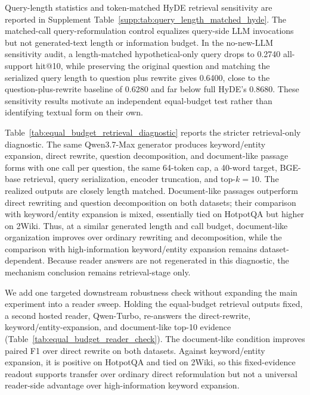 Query-length statistics and token-matched HyDE retrieval sensitivity are reported in Supplement Table~\ref{supp:tab:query_length_matched_hyde}. The matched-call query-reformulation control equalizes query-side LLM invocations but not generated-text length or information budget. In the no-new-LLM sensitivity audit, a length-matched hypothetical-only query drops to 0.2740 all-support hit@10, while preserving the original question and matching the serialized query length to question plus rewrite gives 0.6400, close to the question-plus-rewrite baseline of 0.6280 and far below full HyDE's 0.8680. These sensitivity results motivate an independent equal-budget test rather than identifying textual form on their own.

Table~\ref{tab:equal_budget_retrieval_diagnostic} reports the stricter retrieval-only diagnostic. The same Qwen3.7-Max generator produces keyword/entity expansion, direct rewrite, question decomposition, and document-like passage forms with one call per question, the same 64-token cap, a 40-word target, BGE-base retrieval, query serialization, encoder truncation, and top-$k=10$. The realized outputs are closely length matched. Document-like passages outperform direct rewriting and question decomposition on both datasets; their comparison with keyword/entity expansion is mixed, essentially tied on HotpotQA but higher on 2Wiki. Thus, at a similar generated length and call budget, document-like organization improves over ordinary rewriting and decomposition, while the comparison with high-information keyword/entity expansion remains dataset-dependent. Because reader answers are not regenerated in this diagnostic, the mechanism conclusion remains retrieval-stage only.

We add one targeted downstream robustness check without expanding the main experiment into a reader sweep. Holding the equal-budget retrieval outputs fixed, a second hosted reader, Qwen-Turbo, re-answers the direct-rewrite, keyword/entity-expansion, and document-like top-10 evidence (Table~\ref{tab:equal_budget_reader_check}). The document-like condition improves paired F1 over direct rewrite on both datasets. Against keyword/entity expansion, it is positive on HotpotQA and tied on 2Wiki, so this fixed-evidence readout supports transfer over ordinary direct reformulation but not a universal reader-side advantage over high-information keyword expansion.

